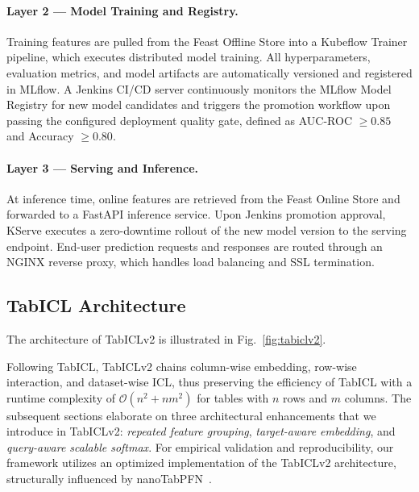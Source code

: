 \documentclass[conference]{IEEEtran}
\begin{document}
\paragraph{Layer 2 --- Model Training and Registry.}
Training features are pulled from the Feast Offline Store into a Kubeflow Trainer pipeline, which executes distributed model training. All hyperparameters, evaluation metrics, and model artifacts are automatically versioned and registered in MLflow. A Jenkins CI/CD server continuously monitors the MLflow Model Registry for new model candidates and triggers the promotion workflow upon passing the configured deployment quality gate, defined as AUC-ROC $\geq 0.85$ 
and Accuracy $\geq 0.80$.

\paragraph{Layer 3 --- Serving and Inference.}
At inference time, online features are retrieved from the Feast 
Online Store and forwarded to a FastAPI inference service. Upon 
Jenkins promotion approval, KServe executes a zero-downtime rollout 
of the new model version to the serving endpoint. End-user prediction 
requests and responses are routed through an NGINX reverse proxy, 
which handles load balancing and SSL termination.

\subsection{TabICL Architecture}


The architecture of TabICLv2 is illustrated in Fig.~\ref{fig:tabiclv2}. 

Following TabICL, TabICLv2 chains column-wise embedding, row-wise interaction, and dataset-wise ICL, thus preserving the efficiency of TabICL with a runtime complexity of 
$\mathcal{O}(n^2 + nm^2)$ for tables with $n$ rows and $m$ columns. 
The subsequent sections elaborate on three architectural enhancements that we introduce in TabICLv2: \emph{repeated feature grouping}, \emph{target-aware embedding}, and \emph{query-aware scalable softmax}. For empirical validation and reproducibility, our framework utilizes an optimized implementation of the TabICLv2 architecture, structurally influenced by nanoTabPFN~\cite{Pfefferle2025NanoTabPFN}.
\end{document}
